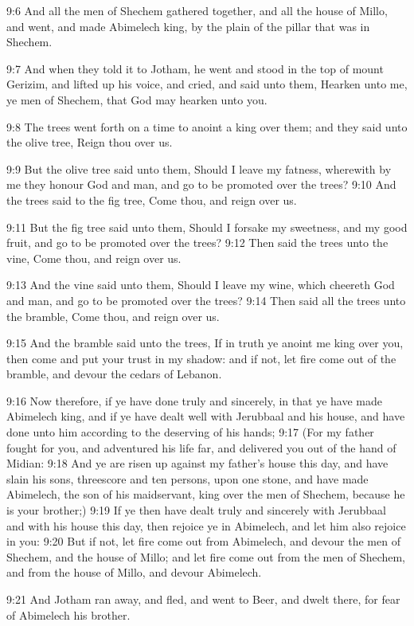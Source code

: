 9:6 And all the men of Shechem gathered together, and all the house of Millo, and went, and made Abimelech king, by the plain of the pillar that was in Shechem.

9:7 And when they told it to Jotham, he went and stood in the top of mount Gerizim, and lifted up his voice, and cried, and said unto them, Hearken unto me, ye men of Shechem, that God may hearken unto you.

9:8 The trees went forth on a time to anoint a king over them; and they said unto the olive tree, Reign thou over us.

9:9 But the olive tree said unto them, Should I leave my fatness, wherewith by me they honour God and man, and go to be promoted over the trees?  9:10 And the trees said to the fig tree, Come thou, and reign over us.

9:11 But the fig tree said unto them, Should I forsake my sweetness, and my good fruit, and go to be promoted over the trees?  9:12 Then said the trees unto the vine, Come thou, and reign over us.

9:13 And the vine said unto them, Should I leave my wine, which cheereth God and man, and go to be promoted over the trees?  9:14 Then said all the trees unto the bramble, Come thou, and reign over us.

9:15 And the bramble said unto the trees, If in truth ye anoint me king over you, then come and put your trust in my shadow: and if not, let fire come out of the bramble, and devour the cedars of Lebanon.

9:16 Now therefore, if ye have done truly and sincerely, in that ye have made Abimelech king, and if ye have dealt well with Jerubbaal and his house, and have done unto him according to the deserving of his hands; 9:17 (For my father fought for you, and adventured his life far, and delivered you out of the hand of Midian: 9:18 And ye are risen up against my father's house this day, and have slain his sons, threescore and ten persons, upon one stone, and have made Abimelech, the son of his maidservant, king over the men of Shechem, because he is your brother;) 9:19 If ye then have dealt truly and sincerely with Jerubbaal and with his house this day, then rejoice ye in Abimelech, and let him also rejoice in you: 9:20 But if not, let fire come out from Abimelech, and devour the men of Shechem, and the house of Millo; and let fire come out from the men of Shechem, and from the house of Millo, and devour Abimelech.

9:21 And Jotham ran away, and fled, and went to Beer, and dwelt there, for fear of Abimelech his brother.

